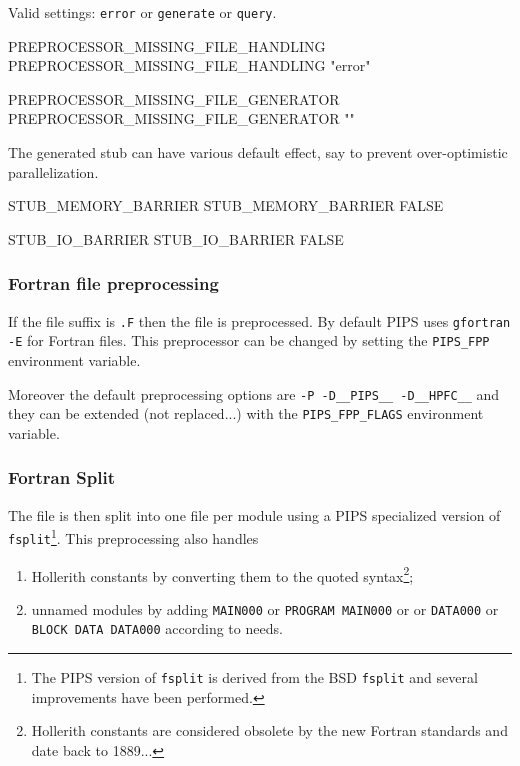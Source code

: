 \documentclass[a4paper]{report}
\begin{document}
Valid settings: \verb|error| or \verb|generate| or \verb|query|.

\begin{PipsProp}{PREPROCESSOR_MISSING_FILE_HANDLING}
PREPROCESSOR_MISSING_FILE_HANDLING "error"
\end{PipsProp}

\begin{PipsProp}{PREPROCESSOR_MISSING_FILE_GENERATOR}
PREPROCESSOR_MISSING_FILE_GENERATOR ""
\end{PipsProp}

The generated stub can have various default effect, say to prevent
over-optimistic parallelization.

\begin{PipsProp}{STUB_MEMORY_BARRIER}
STUB_MEMORY_BARRIER FALSE
\end{PipsProp}

\begin{PipsProp}{STUB_IO_BARRIER}
STUB_IO_BARRIER FALSE
\end{PipsProp}


\subsubsection{Fortran file preprocessing}
\label{sec:fortr-file-prepr}

If the file suffix is \verb|.F| then the file is preprocessed. By default
PIPS uses \verb|gfortran -E| for Fortran files. This preprocessor can be
changed by setting the \verb|PIPS_FPP| environment variable.

Moreover the default preprocessing options are %
\verb|-P -D__PIPS__ -D__HPFC__| and they can be extended (not replaced...)
with the \verb|PIPS_FPP_FLAGS| environment variable.


\subsubsection{Fortran Split}
\label{sec:fortran-split}

The file is then split into one file per module using a PIPS specialized
version of \texttt{fsplit}\footnote{The PIPS version of \texttt{fsplit} is
  derived from the BSD \texttt{fsplit} and several improvements have been
  performed.}. This preprocessing also handles
\begin{enumerate}
\item Hollerith constants by converting them to the quoted
  syntax\footnote{Hollerith constants are considered obsolete by the new
    Fortran standards and date back to 1889...};
\item unnamed modules by adding \texttt{MAIN000} or \texttt{PROGRAM
    MAIN000} or or \texttt{DATA000} or \texttt{BLOCK DATA DATA000}
  according to needs.
\end{enumerate}
\end{document}
